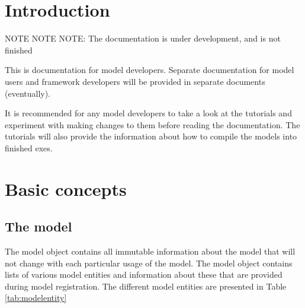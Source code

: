 \documentclass[]{memoir}
\begin{document}
\chapter{Introduction}

NOTE NOTE NOTE: The documentation is under development, and is not finished

This is documentation for model developers. Separate documentation for model users and framework developers will be provided in separate documents (eventually).

It is recommended for any model developers to take a look at the tutorials and experiment with making changes to them before reading the documentation. The tutorials will also provide the information about how to compile the models into finished exes.

\chapter{Basic concepts}

\section{The model}

The model object contains all immutable information about the model that will not change with each particular usage of the model. The model object contains lists of various model entities and information about these that are provided during model registration. The different model entities are presented in Table \ref{tab:modelentity}
\end{document}
